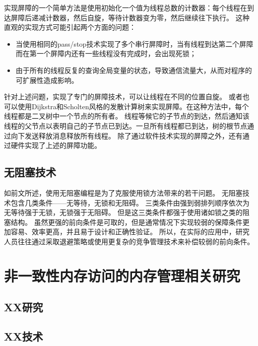 实现屏障的一个简单方法是使用初始化一个值为线程总数的计数器：每个线程在到达屏障后递减计数器，然后自旋，等待计数器变为零，然后继续往下执行。
这种直观的实现方式可能引起两个方面的问题：
\begin{itemize}
	\item 当使用相同的pass/stop技术实现了多个串行屏障时，当有线程到达第二个屏障而在第一个屏障内还有一些线程没有完成时，会出现死锁；
	\item 由于所有的线程反复的查询全局变量的状态，导致通信流量大，从而对程序的可扩展性造成影响。
\end{itemize}
针对上述问题，实现了专门的屏障技术，可以让线程在不同的位置自旋\cite{brooks1986butterfly,hensgen1988two,mellor1992fast,tseng2016scalable}。
或者也可以使用Dijkstra和Scholten风格的发散计算树来实现屏障\cite{dijkstra1980termination}。在这种方法中，每个线程都是二叉树中一个节点的所有者。
线程等候它的子节点的到达，然后通知该线程的父节点以表明自己的子节点已到达。一旦所有线程都已到达，树的根节点通过向下发送释放消息释放所有线程。
除了通过软件技术实现的屏障之外，还有通过硬件实现了上述的屏障功能\cite{solihin2015fundamentals}。

\subsection{无阻塞技术}
如前文所述，使用无阻塞编程是为了克服使用锁方法带来的若干问题。
无阻塞技术包含几类条件——无等待\cite{lamport1974new,herlihy1991wait}，无锁\cite{herlihy1991wait}和无阻碍\cite{herlihy2003obstruction}。
三类条件由强到弱排列顺序依次为无等待强于无锁，无锁强于无阻碍。
但是这三类条件都强于使用诸如锁之类的阻塞结构。
虽然更强的前向条件是可取的，但是通常情况下实现较弱的保障条件更加容易、效率更高，并且易于设计和正确性验证。
所以，在实际的应用中，研究人员往往通过采取退避策略\cite{agarwal1989adaptive}或使用更复杂的竞争管理技术\cite{herlihy2003software}来补偿较弱的前向条件。


\section{非一致性内存访问的内存管理相关研究}

\subsection{XX研究}
\label{sec:}

\subsection{XX技术}


